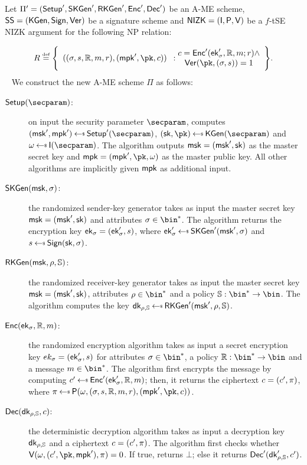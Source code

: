 \begin{construction}\label{constr:ame_nizk}
    Let $\Pi'=(\mathsf{Setup}',\mathsf{SKGen}',\mathsf{RKGen}', \mathsf{Enc}',\mathsf{Dec}')$ be an A-ME scheme, $\mathsf{SS} =(\mathsf{KGen},\mathsf{Sign},\mathsf{Ver})$ be a signature scheme and $\mathsf{NIZK}=(\mathsf{I}, \mathsf{P}, \mathsf{V})$ be a $f$-tSE NIZK argument for the following NP relation:

    \[
        R \eqdef \Biggl\{ \begin{array}{c}((\sattr, \signature, \raccess, \msg, r),(\mpk', \pk, \cipher))\end{array}:\begin{array}{@{}c}
            \cipher = \enc'(\ek'_\sattr, \raccess, \msg; r) \land \\
            \ver(\pk, (\sattr, \signature)) = 1
        \end{array} \Biggr\}.
    \]
    ~\newline\newline
    We construct the new A-ME scheme $\Pi$ as follows:
    \begin{description}
        \item[$\setup(\secparam)$:] on input the security parameter $\secparam$, computes $(\msk', \mpk') \getsr \setup'(\secparam)$, $(\sk, \pk) \getsr \kgen(\secparam)$ and $\crs \getsr \init(\secparam)$. The algorithm outputs $\mathsf{msk} = (\mathsf{msk}', \mathsf{sk})$ as the master secret key and $\mpk = (\mpk', \pk, \crs)$ as the master public key. All other algorithms are implicitly given $\mathsf{mpk}$ as additional input.
        \item[$\mathsf{SKGen}(\mathsf{msk}, \sigma)$:] the randomized sender-key generator takes as input the master secret key $\mathsf{msk} = (\mathsf{msk}', \mathsf{sk})$ and attributes $\sattr \in \bin^*$. The algorithm returns the encryption key $\mathsf{ek}_\sigma = (\mathsf{ek}'_\sigma, s)$, where $\ek'_\sattr \getsr \skgen'(\msk', \sattr)$ and $\signature \getsr \sign(\sk, \sattr)$.
        \item[$\mathsf{RKGen}(\mathsf{msk}, \rho, \mathbb{S})$:] the randomized receiver-key generator takes as input the master secret key $\mathsf{msk} = (\mathsf{msk}', \mathsf{sk})$, attributes $\rattr \in \bin^*$ and a policy $\saccess:\bin^* \to \bin$. The algorithm computes the key $\dk_{\rattr, \saccess} \getsr \rkgen'(\msk', \rattr, \saccess)$.
        \item[$\mathsf{Enc}(\mathsf{ek}_\sigma, \mathbb{R}, m)$:] the randomized encryption algorithm takes as input a secret encryption key $ek_\sigma = (\mathsf{ek}'_\sigma, s)$ for attributes $\sattr \in \bin^*$, a policy $\raccess: \bin^* \to \bin$ and a message $\msg \in \bin^*$. The algorithm first encrypts the message by computing $\cipher' \getsr \enc'(\ek'_\sattr, \raccess, \msg)$; then, it returns the ciphertext $c = (c', \pi)$, where $\pi \getsr \prover(\crs, (\sattr, \signature, \raccess, \msg, r),(\mpk', \pk, \cipher))$.
        \item[$\mathsf{Dec}(\mathsf{dk}_{\rho, \mathbb{S}}, c)$:] the deterministic decryption algorithm takes as input a decryption key $\mathsf{dk}_{\rho, \mathbb{S}}$ and a ciphertext $c = (c', \pi)$. The algorithm first checks whether $\verifier(\crs, (\cipher', \pk, \mpk'), \pi) = 0$. If true, returns $\bot$; else it returns $\mathsf{Dec}'(\mathsf{dk}'_{\rho, \mathbb{S}}, c')$.
    \end{description}
\end{construction}